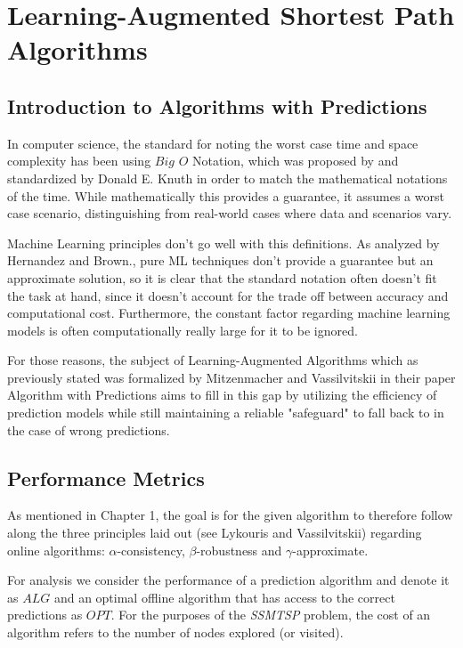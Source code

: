\chapter{Learning-Augmented Shortest Path Algorithms}
\label{ch:learning_augmented}

\section{Introduction to Algorithms with Predictions}
In computer science, the standard for noting the worst case time and space complexity has been using $Big$ $O$ Notation, 
which was proposed by and standardized by Donald E. Knuth\cite{knuthBigOmicronBig1976} in order to match the mathematical notations of the time. 
While mathematically this provides a guarantee, it assumes a worst case scenario, distinguishing from real-world cases where data and scenarios vary.

Machine Learning principles don't go well with this definitions. 
As analyzed by Hernandez and Brown.\cite{hernandezMeasuringAlgorithmicEfficiency2020}, pure ML techniques don't provide a guarantee but an approximate solution, 
so it is clear that the standard notation often doesn't fit the task at hand, since it doesn't account for the trade off between accuracy and computational cost. 
Furthermore, the constant factor regarding machine learning models is often computationally really large for it to be ignored. 

For those reasons, the subject of Learning-Augmented Algorithms which as previously stated was formalized by Mitzenmacher and Vassilvitskii in their paper 
Algorithm with Predictions\cite{mitzenmacherAlgorithmsPredictions2020} aims to fill in this gap by utilizing the efficiency of prediction models 
while still maintaining a reliable "safeguard" to fall back to in the case of wrong predictions.

\section{Performance Metrics}
\label{sec:prinicples}
As mentioned in Chapter 1, the goal is for the given algorithm to therefore follow along the three principles laid out 
(see Lykouris and Vassilvitskii\cite{lykourisCompetitiveCachingMachine2021}) regarding online algorithms: $\alpha$-consistency, $\beta$-robustness and $\gamma$-approximate.

For analysis we consider the performance of a prediction algorithm and denote it as $ALG$ and an optimal offline algorithm that has access to the correct predictions as $OPT$.
For the purposes of the \textit{SSMTSP} problem, the cost of an algorithm refers to the number of nodes explored (or visited).

